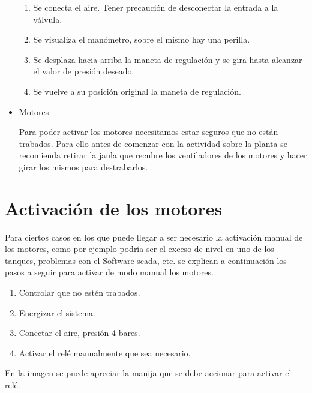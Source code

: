 \begin{itemize}
 \begin{enumerate}
  \item Se conecta el aire. Tener precaución de desconectar la entrada a la válvula. 
  \item Se visualiza el manómetro, sobre el mismo hay una perilla.
  \item Se desplaza hacia arriba la maneta de regulación y se gira hasta alcanzar el
  valor de presión deseado.
  \item Se vuelve a su posición original la maneta de regulación.
 \end{enumerate}

 
 
 \item Motores
 
 Para poder activar los motores necesitamos estar seguros que no están trabados.
 Para ello antes de comenzar con la actividad sobre la planta se recomienda retirar
 la jaula que recubre los ventiladores de los motores y hacer girar los mismos
 para destrabarlos.
 
 \end{itemize}

 
 \section{Activación de los motores}
 
 Para ciertos casos en los que puede llegar a ser necesario la activación 
 manual de los motores, como por ejemplo podría ser el exceso de nivel en 
 uno de los tanques, problemas con el Software \gls{scada}, etc. se explican
 a continuación los pasos a seguir para activar de modo manual los motores.

  \begin{enumerate}
   \item Controlar que no estén trabados.
   \item Energizar el sistema.
   \item Conectar el aire, presión 4 bares.
   \item Activar el relé manualmente que sea necesario.
  \end{enumerate}
  
  En la imagen se puede apreciar la manija que se debe accionar para activar 
  el relé.
